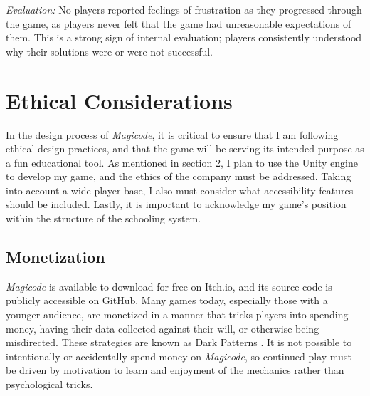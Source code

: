 \documentclass[10pt,twocolumn]{article}
\begin{document}
\textit{Evaluation:} No players reported feelings of frustration as they progressed through the game, as players never felt that the game had unreasonable expectations of them. This is a strong sign of internal evaluation; players consistently understood why their solutions were or were not successful.



\section{Ethical Considerations}
In the design process of \textit{Magicode}, it is critical to ensure that I am following ethical design practices, and that the game will be serving its intended purpose as a fun educational tool. As mentioned in section 2, I plan to use the Unity engine to develop my game, and the ethics of the company must be addressed. Taking into account a wide player base, I also must consider what accessibility features should be included. Lastly, it is important to acknowledge my game’s position within the structure of the schooling system.

\subsection{Monetization}
\textit{Magicode} is available to download for free on Itch.io, and its source code is publicly accessible on GitHub. Many games today, especially those with a younger audience, are monetized in a manner that tricks players into spending money, having their data collected against their will, or otherwise being misdirected. These strategies are known as Dark Patterns \cite{dark-patterns-website}\cite{dark-patterns-from-class}. It is not possible to intentionally or accidentally spend money on \textit{Magicode}, so continued play must be driven by motivation to learn and enjoyment of the mechanics rather than psychological tricks.
\end{document}
